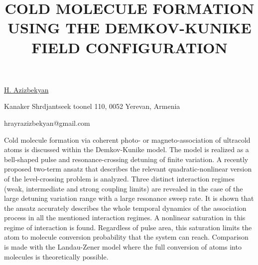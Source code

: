 \title{COLD MOLECULE FORMATION USING THE DEMKOV-KUNIKE FIELD CONFIGURATION}

\underline{H. Azizbekyan} 

{\normalsize{\vspace{-4mm}
Kanaker Shrdjantseek toonel 110, 0052 Yerevan, Armenia

\email hrayrazizbekyan@gmail.com}}

Cold molecule formation via coherent photo- or magneto-association of ultracold atoms is discussed within the Demkov-Kunike model. The model is realized as a bell-shaped pulse and resonance-crossing detuning of finite variation. A recently proposed two-term ansatz that describes the relevant quadratic-nonlinear version of the level-crossing problem is analyzed. Three distinct interaction regimes (weak, intermediate and strong coupling limits) are revealed in the case of the large detuning variation range with a large resonance sweep rate. It is shown that the ansatz accurately describes the whole temporal dynamics of the association process in all the mentioned interaction regimes. A nonlinear saturation in this regime of interaction is found. Regardless of pulse area, this saturation limits the atom to molecule conversion probability that the system can reach. Comparison is made with the Landau-Zener model where the full conversion of atoms into molecules is theoretically possible.

\vspace{\baselineskip} 